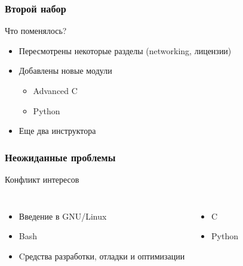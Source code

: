 \begin{frame}
\frametitle{Второй набор}
  \begin{block}{Что поменялось?}
	  \begin{itemize}
		\item Пересмотрены некоторые разделы (networking, лицензии)
		\item Добавлены новые модули
		  \begin{itemize}
	        \item Advanced C
			\item Python
		  \end{itemize}
		\item Еще два инструктора
	  \end{itemize}
  \end{block}
\end{frame}


\begin{frame}
  \frametitle{Неожиданные проблемы}

  \begin{block}{Конфликт интересов}


	\begin{columns}
		\begin{itemize}
			\item Введение в GNU/Linux
			\item Bash
			\item Cредства разработки, отладки и оптимизации
		\end{itemize}

		

		\begin{itemize}
		  \item C
		  \item Python
		\end{itemize}
	\end{columns}

  \end{block}

\end{frame}

